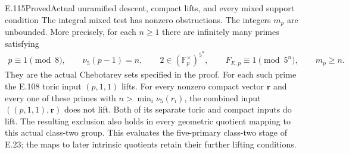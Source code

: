 \begin{statement}{E.115}{Proved}{Actual unramified descent, compact lifts, and every mixed support condition}
The integral mixed test has nonzero obstructions.  The integers
$m_p$ are unbounded.  More precisely, for each $n\ge1$ there
are infinitely many primes satisfying
\[
 \begin{gathered}
 p\equiv1\pmod8,\qquad \nu_5(p-1)=n,\qquad
 2\in(\mathbb F_p^{\times})^{5^n},\qquad
 F_{E,p}\equiv1\pmod{5^n},\qquad m_p\ge n.
 \end{gathered}
 \tag{E115.7}
\]
They are the actual Chebotarev sets specified in the proof.
For each such prime the E.108 toric input $(p,1,1)$ lifts.
For every nonzero compact vector $\mathbf r$ and every one
of these primes with $n>\min_i\nu_5(r_i)$, the combined input
$((p,1,1),\mathbf r)$ does not lift.
Both of its separate toric and compact inputs do lift.
The resulting exclusion also holds in every geometric quotient
mapping to this actual class-two group.
This evaluates the five-primary class-two stage of E.23;
the maps to later intrinsic quotients retain their further
lifting conditions.
\end{statement}
